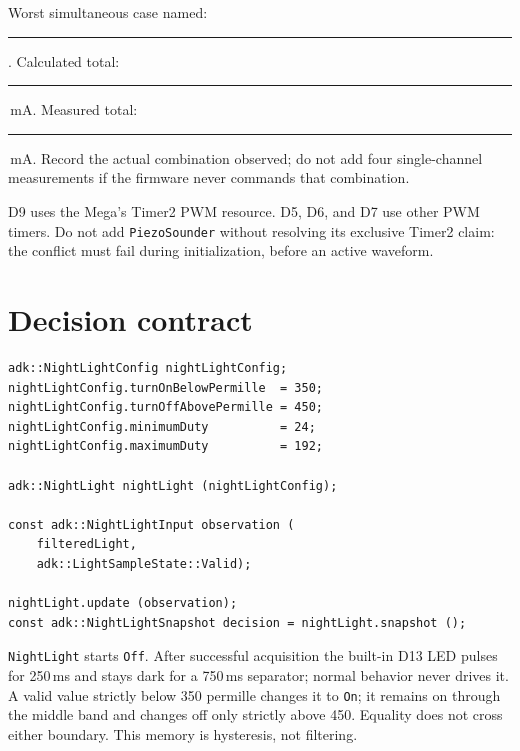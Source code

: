 \documentclass[11pt]{article}
\newcommand{\blank}[1]{\rule{#1}{0.4pt}}
\begin{document}
Worst simultaneous case named: \blank{1.5in}. Calculated total:
\blank{.7in}\,mA. Measured total: \blank{.7in}\,mA. Record the actual
combination observed; do not add four single-channel measurements if the
firmware never commands that combination.

D9 uses the Mega's Timer2 PWM resource. D5, D6, and D7 use other PWM timers.
Do not add \texttt{PiezoSounder} without resolving its exclusive Timer2 claim:
the conflict must fail during initialization, before an active waveform.

\newpage
\section{Decision contract}

\begin{lstlisting}[style=adkcpp]
adk::NightLightConfig nightLightConfig;
nightLightConfig.turnOnBelowPermille  = 350;
nightLightConfig.turnOffAbovePermille = 450;
nightLightConfig.minimumDuty          = 24;
nightLightConfig.maximumDuty          = 192;

adk::NightLight nightLight (nightLightConfig);

const adk::NightLightInput observation (
    filteredLight,
    adk::LightSampleState::Valid);

nightLight.update (observation);
const adk::NightLightSnapshot decision = nightLight.snapshot ();
\end{lstlisting}

\texttt{NightLight} starts \texttt{Off}. After successful acquisition the
built-in D13 LED pulses for 250\,ms and stays dark for a 750\,ms separator;
normal behavior never drives it. A valid value strictly below 350
permille changes it to \texttt{On}; it remains on through the middle band and
changes off only strictly above 450. Equality does not cross either boundary.
This memory is hysteresis, not filtering.

\begin{center}
\end{center}
\end{document}

